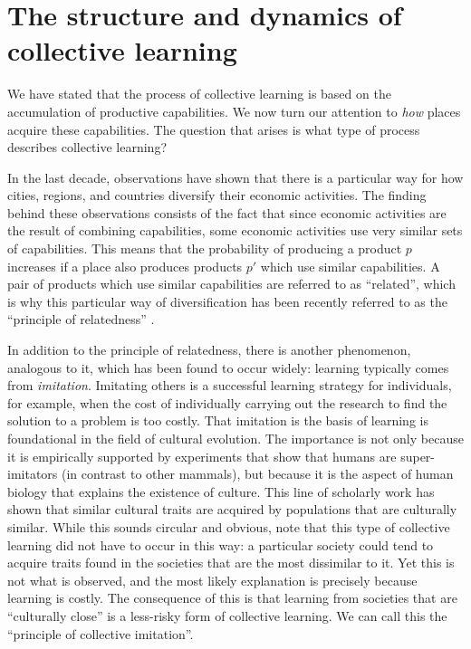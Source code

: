 \documentclass[12pt]{article}
\begin{document}

\section{The structure and dynamics of collective learning}
We have stated that the process of collective learning is based on the accumulation of productive capabilities. We now turn our attention to \emph{how} places acquire these capabilities. The question that arises is what type of process describes collective learning? 

In the last decade, observations have shown that there is a particular way for how cities, regions, and countries diversify their economic activities. The finding behind these observations consists of the fact that since economic activities are the result of combining capabilities, some economic activities use very similar sets of capabilities. This means that the probability of producing a product $p$ increases if a place also produces products $p'$ which use similar capabilities. A pair of products which use similar capabilities are referred to as ``related'', which is why this particular way of diversification has been recently referred to as the ``principle of relatedness'' \citep{HidalgoEtAl2007,Neffke2013SkillRelatedness}. 

In addition to the principle of relatedness, there is another phenomenon, analogous to it, which has been found to occur widely: learning typically comes from \emph{imitation}. Imitating others is a successful learning strategy for individuals, for example, when the cost of individually carrying out the research to find the solution to a problem is too costly. That imitation is the basis of learning is foundational in the field of cultural evolution. The importance is not only because it is empirically supported by experiments that show that humans are super-imitators (in contrast to other mammals), but because it is the aspect of human biology that explains the existence of culture. This line of scholarly work has shown that similar cultural traits are acquired by populations that are culturally similar. While this sounds circular and obvious, note that this type of collective learning did not have to occur in this way: a particular society could tend to acquire traits found in the societies that are the most dissimilar to it. Yet this is not what is observed, and the most likely explanation is precisely because learning is costly. The consequence of this is that learning from societies that are ``culturally close'' is a less-risky form of collective learning. We can call this the ``principle of collective imitation''.
\end{document}

